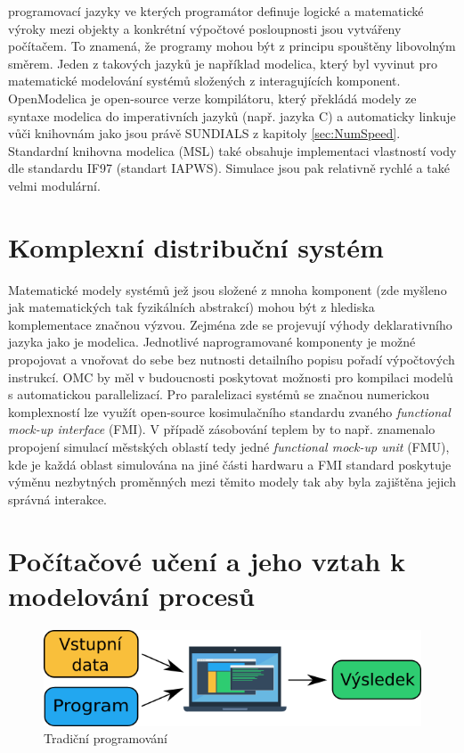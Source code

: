 programovací jazyky ve kterých programátor definuje logické a matematické
výroky mezi objekty a konkrétní výpočtové posloupnosti jsou vytvářeny
počítačem. To znamená, že programy mohou být z principu spouštěny libovolným
směrem. Jeden z takových jazyků je například modelica, který byl vyvinut pro
matematické modelování systémů složených z interagujících komponent.
OpenModelica  je open-source verze kompilátoru, který překládá
modely ze syntaxe modelica do imperativních jazyků (např. jazyka C) a
automaticky linkuje vůči knihovnám jako jsou právě SUNDIALS z kapitoly
\ref{sec:NumSpeed}. Standardní knihovna modelica (MSL) také obsahuje
implementaci vlastností vody dle standardu IF97 (standart IAPWS). Simulace jsou
pak relativně rychlé a také velmi modulární.

\section{Komplexní distribuční systém}
\label{sec:Complex_distr_sys}
Matematické modely systémů jež jsou složené z mnoha komponent (zde myšleno jak
matematických tak fyzikálních abstrakcí) mohou být z hlediska komplementace
značnou výzvou. Zejména zde se projevují výhody deklarativního jazyka jako je
modelica. Jednotlivé naprogramované komponenty je možné propojovat a vnořovat
do sebe bez nutnosti detailního popisu pořadí výpočtových instrukcí. OMC by měl
v budoucnosti poskytovat možnosti pro kompilaci modelů s automatickou
parallelizací. Pro paralelizaci systémů se značnou numerickou komplexností lze
využít open-source kosimulačního standardu zvaného \textit{functional mock-up
interface} (FMI). V případě zásobování teplem by to např. znamenalo propojení
simulací městských oblastí tedy jedné \textit{functional mock-up unit} (FMU),
kde je každá oblast simulována na jiné části hardwaru a FMI standard poskytuje
výměnu nezbytných proměnných mezi těmito modely tak aby byla zajištěna jejich
správná interakce.

\section{Počítačové učení a jeho vztah k modelování procesů}
\label{sec:ML}
\begin{figure}[h] \centering \capstart
  \includegraphics[scale=0.6]{figures/traditional_prog_cz}
  \caption{Tradiční programování}
  \label{fig:traditional_prog}
\end{figure}

